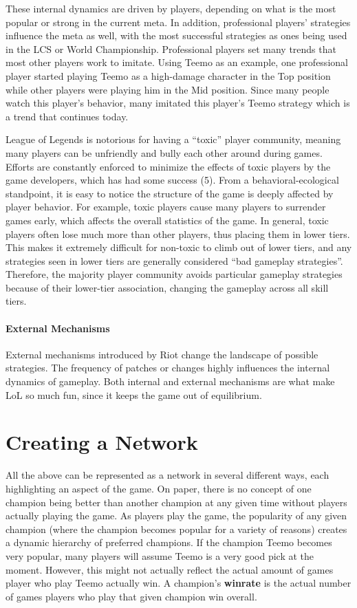 \documentclass[twoside]{article}
\begin{document}
\begin{multicols}{2}
These internal dynamics are driven by players, depending on what is the most popular or strong in the current meta. In addition, professional players' strategies influence the meta as well, with the most successful strategies as ones being used in the LCS or World Championship. Professional players set many trends that most other players work to imitate. Using Teemo as an example, one professional player started playing Teemo as a high-damage character in the Top position while other players were playing him in the Mid position. Since many people watch this player's behavior, many imitated this player's Teemo strategy which is a trend that continues today.

League of Legends is notorious for having a ``toxic'' player community, meaning many players can be unfriendly and bully each other around during games. Efforts are constantly enforced to minimize the effects of toxic players by the game developers, which has had some success (5). From a behavioral-ecological standpoint, it is easy to notice the structure of the game is deeply affected by player behavior. For example, toxic players cause many players to surrender games early, which affects the overall statistics of the game. In general, toxic players often lose much more than other players, thus placing them in lower tiers. This makes it extremely difficult for non-toxic to climb out of lower tiers, and any strategies seen in lower tiers are generally considered ``bad gameplay strategies''. Therefore, the majority player community avoids particular gameplay strategies because of their lower-tier association, changing the gameplay across all skill tiers.

\paragraph{External Mechanisms} External mechanisms introduced by Riot change the landscape of possible strategies. The frequency of patches or changes highly influences the internal dynamics of gameplay. Both internal and external mechanisms are what make LoL so much fun, since it keeps the game out of equilibrium.



\section{Creating a Network}
All the above can be represented as a network in several different ways, each highlighting an aspect of the game. On paper, there is no concept of one champion being better than another champion at any given time without players actually playing the game. As players play the game, the popularity of any given champion (where the champion becomes popular for a variety of reasons) creates a dynamic hierarchy of preferred champions. If the champion Teemo becomes very popular, many players will assume Teemo is a very good pick at the moment. However, this might not actually reflect the actual amount of games player who play Teemo actually win. A champion's \textbf{winrate} is the actual number of games players who play that given champion win overall.


\end{multicols}
\end{document}
